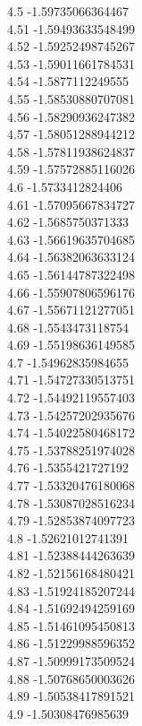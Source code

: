 {4.5	-1.59735066364467\\
4.51	-1.59493633548499\\
4.52	-1.59252498745267\\
4.53	-1.59011661784531\\
4.54	-1.5877112249555\\
4.55	-1.58530880707081\\
4.56	-1.58290936247382\\
4.57	-1.58051288944212\\
4.58	-1.57811938624837\\
4.59	-1.57572885116026\\
4.6	-1.5733412824406\\
4.61	-1.57095667834727\\
4.62	-1.5685750371333\\
4.63	-1.56619635704685\\
4.64	-1.56382063633124\\
4.65	-1.56144787322498\\
4.66	-1.55907806596176\\
4.67	-1.55671121277051\\
4.68	-1.5543473118754\\
4.69	-1.55198636149585\\
4.7	-1.54962835984655\\
4.71	-1.54727330513751\\
4.72	-1.54492119557403\\
4.73	-1.54257202935676\\
4.74	-1.54022580468172\\
4.75	-1.53788251974028\\
4.76	-1.5355421727192\\
4.77	-1.53320476180068\\
4.78	-1.53087028516234\\
4.79	-1.52853874097723\\
4.8	-1.52621012741391\\
4.81	-1.52388444263639\\
4.82	-1.52156168480421\\
4.83	-1.51924185207244\\
4.84	-1.51692494259169\\
4.85	-1.51461095450813\\
4.86	-1.51229988596352\\
4.87	-1.50999173509524\\
4.88	-1.50768650003626\\
4.89	-1.50538417891521\\
4.9	-1.50308476985639\\
}
